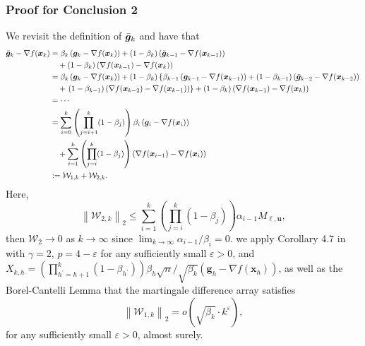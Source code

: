 \documentclass[aos]{imsart}
\numberwithin{equation}{section}
\theoremstyle{plain}
\begin{document}
\begin{appendix}
\subsubsection{Proof for Conclusion 2}
We revisit the definition of $\Bar{\bm{g}}_k$ and have that
     \begin{equation*}
        \begin{split}
            \Bar{\bm{g}}_{k} - \nabla f(\bm{x}_k) & = \beta_k \left( \bm{g}_k - \nabla f(\bm{x}_k) \right) + (1-\beta_k) \left( \Bar{\bm{g}}_{k-1} - \nabla f(\bm{x}_{k-1}) \right) \\
            & \hspace{1em} + (1-\beta_k) \left( \nabla f(\bm{x}_{k-1}) - \nabla f(\bm{x}_k) \right)\\
            & = \beta_k \left( \bm{g}_k - \nabla f(\bm{x}_k) \right) + (1-\beta_k)  \left\{ \beta_{k-1} \left( \bm{g}_{k-1} - \nabla f(\bm{x}_{k-1}) \right)  + (1-\beta_{k-1}) \left( \Bar{\bm{g}}_{k-2} - \nabla f(\bm{x}_{k-2}) \right) \right.\\
            & \hspace{1em} + \left. (1-\beta_{k-1}) \left( \nabla f(\bm{x}_{k-2}) - \nabla f(\bm{x}_{k-1}) \right) \right\} + (1-\beta_k) \left( \nabla f(\bm{x}_{k-1}) - \nabla f(\bm{x}_k) \right) \\
            & = \cdots\\
            & = \sum_{i=0}^{k} \left( \prod_{j=i+1}^{k} (1-\beta_j) \right) \beta_i \left( \bm{g}_{i} - \nabla f(\bm{x}_{i}) \right) \\
            & \hspace{1em} + \sum_{i=1}^{k} \left( \prod_{j=i}^{k} (1-\beta_j) \right) \left( \nabla f(\bm{x}_{i-1}) - \nabla f(\bm{x}_{i}) \right) \\
            & := \mathcal{W}_{1,k} + \mathcal{W}_{2,k}.
        \end{split}
    \end{equation*}
    Here, \begin{equation*}
        \left\|\mathcal{W}_{2,k}\right\|_2 \leq \sum_{i=1}^{k} \left( \prod_{j=i}^{k} (1-\beta_j) \right) \alpha_{i-1} M_{\bm{\ell},\bm{u}},
    \end{equation*}
    then $\mathcal{W}_2 \to 0$ as $k \to \infty$ since $\lim_{k \to \infty} \alpha_{i-1}/\beta_i = 0$. we apply Corollary 4.7 in \cite{hao2014convergence} with $\gamma = 2$, $p = 4-\varepsilon$ for any sufficiently small $\varepsilon > 0$, and $X_{k,h} = \left( \prod_{h^{\prime}=h+1}^{k} (1-\beta_{h^{\prime}}) \right) \beta_h \sqrt{n} / \sqrt{\beta_k} \left( \bm{g}_h - \nabla f(\bm{x}_{h}) \right)$, as well as the Borel-Cantelli Lemma that the martingale difference array satisfies
    \begin{equation*}
        \left\|\mathcal{W}_{1,k}\right\|_2 = o\left( \sqrt{\beta_k} \cdot k^{\varepsilon} \right),
    \end{equation*}
    for any sufficiently small $\varepsilon > 0$, almost surely.



\end{appendix}
\end{document}
